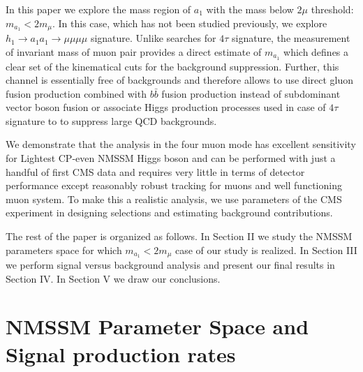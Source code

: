 \documentclass[aps,12pt,superscriptaddress,nofootinbib,floatfix,showpacs]{revtex4}
\begin{document}
In this paper we explore the  mass region of  $a_1$ 
with the mass below $2\mu$ threshold: $m_{a_1}<2m_\mu$.
In this case, which has not been studied previously, we 
explore $h_1 \to a_1a_1 \to \mu \mu \mu \mu$ signature.
Unlike searches for $4\tau$ signature,
the measurement of invariant mass of muon pair provides a 
direct estimate of $m_{a_1}$ which defines a clear set of the kinematical
cuts for the background suppression. 
Further, this
channel is essentially free of backgrounds and therefore allows to use
direct gluon fusion production combined with  $b\bar{b}$ fusion production
instead of subdominant  vector boson fusion or associate 
Higgs production processes used in case of $4\tau$ signature to to suppress large QCD
backgrounds.

We demonstrate that the analysis in
the four muon mode has excellent sensitivity for Lightest CP-even NMSSM Higgs boson
and can be performed with just  a handful of first CMS data and requires 
very little in terms of detector performance  except reasonably robust tracking 
for muons and well functioning muon system. To make 
this a realistic analysis, we use parameters of the CMS experiment in designing
selections and estimating background contributions.

The rest of the paper is organized as follows.
In Section II we study the NMSSM parameters space 
for which $m_{a_1}<2m_\mu$ case of our study is realized.
In Section III we perform signal versus background analysis
and present our final  results in Section IV.
In Section V we draw our conclusions.



\section{NMSSM Parameter Space and Signal production rates}
\end{document}
